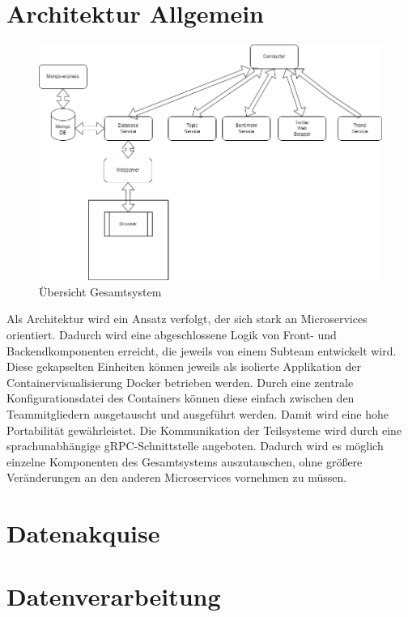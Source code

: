 \documentclass[conference]{IEEEtran}
\begin{document}
\section{Architektur Allgemein}
\begin{figure}
    \centering
    \includegraphics[width=\textwidth]{Architecture.png}
    \caption{Übersicht Gesamtsystem}
\end{figure}

Als Architektur wird ein Ansatz verfolgt, der sich stark an Microservices orientiert.
Dadurch wird eine abgeschlossene Logik von Front- und Backendkomponenten erreicht, die jeweils
von einem Subteam entwickelt wird. Diese gekapselten Einheiten können jeweils als isolierte Applikation der Containervisualisierung Docker betrieben werden. 
Durch eine zentrale Konfigurationsdatei des Containers können diese einfach zwischen den Teammitgliedern
ausgetauscht und ausgeführt werden. Damit wird eine hohe Portabilität gewährleistet.
Die Kommunikation der Teilsysteme wird durch eine sprachunabhängige gRPC-Schnittstelle angeboten. 
Dadurch wird es möglich einzelne Komponenten des Gesamtsystems auszutauschen, ohne größere Veränderungen an den anderen Microservices vornehmen zu müssen.\cite{microservices}


\section{Datenakquise}

\section{Datenverarbeitung}
\end{document}

